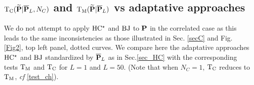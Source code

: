 \documentclass[journal]{IEEEtran}
\begin{document}
\subsection{${\rm  T_C}({\bf \widetilde{\bf P}}|\overline{\bf P}_L,N_C)$ and ${\rm T_M}({\bf \widetilde{\bf P}}|\overline{\bf P}_L)$ vs adaptative approaches} 
 \label{SecF}
  We do not attempt to apply  ${\rm HC^\star}$ and ${\rm BJ}$ to ${\bf{P}}$ in the correlated case as this leads to the same inconsistencies as those illustrated in Sec. \ref{secC} and Fig. \ref{Fig2},   {top left panel, dotted curves.}
 We compare here the  adaptative approaches ${\rm HC^\star}$ and ${\rm BJ}$  standardized by $\overline{\bf P}_L$  as in Sec.\ref{sec_HC} with the corresponding  tests ${\rm T_M}$ and ${\rm T_C}$  for $L=1$ and $L=50$. (Note that when $N_C=1$, ${\rm T_C}$ reduces to ${\rm T_M}$, \textit{cf} \eqref{test_ch}). 
 
\end{document}
